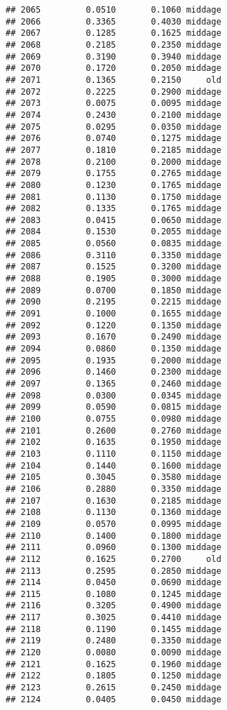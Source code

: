 \documentclass[
]{article}
\begin{document}
\begin{verbatim}
## 2065         0.0510       0.1060 middage
## 2066         0.3365       0.4030 middage
## 2067         0.1285       0.1625 middage
## 2068         0.2185       0.2350 middage
## 2069         0.3190       0.3940 middage
## 2070         0.1720       0.2050 middage
## 2071         0.1365       0.2150     old
## 2072         0.2225       0.2900 middage
## 2073         0.0075       0.0095 middage
## 2074         0.2430       0.2100 middage
## 2075         0.0295       0.0350 middage
## 2076         0.0740       0.1275 middage
## 2077         0.1810       0.2185 middage
## 2078         0.2100       0.2000 middage
## 2079         0.1755       0.2765 middage
## 2080         0.1230       0.1765 middage
## 2081         0.1130       0.1750 middage
## 2082         0.1335       0.1765 middage
## 2083         0.0415       0.0650 middage
## 2084         0.1530       0.2055 middage
## 2085         0.0560       0.0835 middage
## 2086         0.3110       0.3350 middage
## 2087         0.1525       0.3200 middage
## 2088         0.1905       0.3000 middage
## 2089         0.0700       0.1850 middage
## 2090         0.2195       0.2215 middage
## 2091         0.1000       0.1655 middage
## 2092         0.1220       0.1350 middage
## 2093         0.1670       0.2490 middage
## 2094         0.0860       0.1350 middage
## 2095         0.1935       0.2000 middage
## 2096         0.1460       0.2300 middage
## 2097         0.1365       0.2460 middage
## 2098         0.0300       0.0345 middage
## 2099         0.0590       0.0815 middage
## 2100         0.0755       0.0980 middage
## 2101         0.2600       0.2760 middage
## 2102         0.1635       0.1950 middage
## 2103         0.1110       0.1150 middage
## 2104         0.1440       0.1600 middage
## 2105         0.3045       0.3580 middage
## 2106         0.2880       0.3350 middage
## 2107         0.1630       0.2185 middage
## 2108         0.1130       0.1360 middage
## 2109         0.0570       0.0995 middage
## 2110         0.1400       0.1800 middage
## 2111         0.0960       0.1300 middage
## 2112         0.1625       0.2700     old
## 2113         0.2595       0.2850 middage
## 2114         0.0450       0.0690 middage
## 2115         0.1080       0.1245 middage
## 2116         0.3205       0.4900 middage
## 2117         0.3025       0.4410 middage
## 2118         0.1190       0.1455 middage
## 2119         0.2480       0.3350 middage
## 2120         0.0080       0.0090 middage
## 2121         0.1625       0.1960 middage
## 2122         0.1805       0.1250 middage
## 2123         0.2615       0.2450 middage
## 2124         0.0405       0.0450 middage

\end{verbatim}
\end{document}
